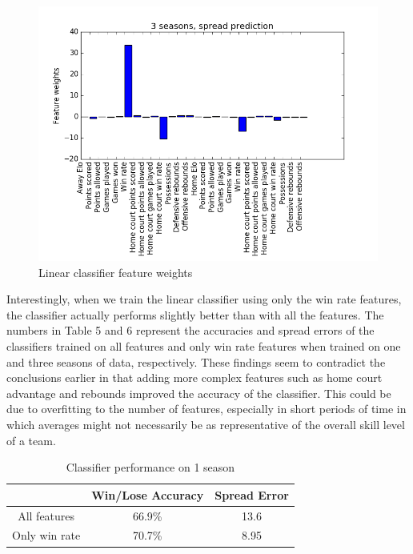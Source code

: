 \documentclass{article}
\begin{document}
\begin{figure}[width=\linewidth]
\begin{multicols}{2}
  \includegraphics[width=1.2\linewidth]{code/figures/3seasons,spreads.png}
\end{multicols}
\caption{Linear classifier feature weights}
\end{figure}

Interestingly, when we train the linear classifier using only the win rate features, the classifier actually performs slightly better than with all the features. The numbers in Table 5 and 6 represent the accuracies and spread errors of the classifiers trained on all features and only win rate features when trained on one and three seasons of data, respectively. These findings seem to contradict the conclusions earlier in that adding more complex features such as home court advantage and rebounds improved the accuracy of the classifier. This could be due to overfitting to the number of features, especially in short periods of time in which averages might not necessarily be as representative of the overall skill level of a team.

\begin{table}
  \begin{center}
    \begin{tabular}{ | c | c | c | }
      \hline
                         & Win/Lose Accuracy & Spread Error  \\ \hline
      All features       & 66.9\%            & 13.6         \\ \hline
      Only win rate      & 70.7\%            & 8.95         \\ \hline
    \end{tabular}
  \end{center}
  \caption{Classifier performance on 1 season}
\end{table}
\end{document}
